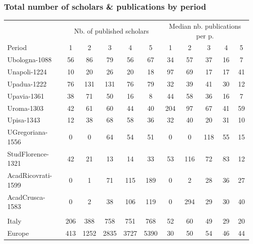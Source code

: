 \documentclass[usepdftitle=false,aspectratio=169,xcolor=dvipsnames]{beamer}
\begin{document}
\begin{frame}
\frametitle{Total number of scholars \& publications by period}

\small
		\begin{tabular}{@{ \extracolsep{1pt}}lcccccccccc}
			\hline
			\hline
			& \multicolumn{5}{c}{Nb. of published scholars}  & \multicolumn{5}{c}{ Median nb. publications per p.}\\
			Period   & 1 &2 & 3 & 4 & 5  & 1 &2 & 3 & 4 & 5\\
			\hline
Ubologna-1088 & 56       & 86       & 79       & 56       & 67       & 34       & 57       & 37       & 16       & 7 \\
Unapoli-1224 & 10       & 20       & 26       & 20       & 18       & 97       & 69       & 17       & 17       & 41 \\
Upadua-1222 & 76       & 131      & 131      & 76       & 79       & 32       & 39       & 41       & 30       & 12 \\
Upavia-1361 & 38       & 71       & 50       & 16       & 8        & 44       & 58       & 36       & 16       & 7 \\
Uroma-1303 & 42       & 61       & 60       & 44       & 40       & 204      & 97       & 67       & 41       & 59 \\
Upisa-1343 & 12       & 38       & 68       & 58       & 36       & 32       & 40       & 20       & 31       & 10 \\
UGregoriana-1556 & 0        & 0        & 64       & 54       & 51       & 0        & 0        & 118      & 55       & 15 \\
StudFlorence-1321 & 42       & 21       & 13       & 14       & 33       & 53       & 116      & 72       & 83       & 12 \\
AcadRicovrati-1599 & 0        & 1        & 71       & 115      & 189      & 0        & 2        & 28       & 36       & 27 \\
AcadCrusca-1583 & 0        & 2        & 38       & 106      & 119      & 0        & 294      & 29       & 30       & 40 \\
\\
Italy    & 206      & 388      & 758      & 751      & 768      & 52       & 60       & 49       & 29       & 20 \\
Europe   & 413      & 1252     & 2835     & 3727     & 5390     & 30       & 50       & 54       & 46       & 44  \\
			\hline
			\hline
	\end{tabular}


\end{frame}
\end{document}
